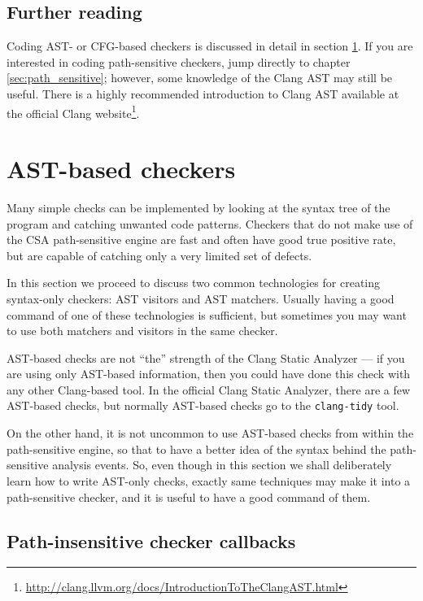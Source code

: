\documentclass[a4paper,12pt]{article}
\begin{document}
\subsection{Further reading}

Coding AST- or CFG-based checkers is discussed in detail in section \ref{sec:ast_based}. If you are interested in coding path-sensitive checkers, jump directly to chapter \ref{sec:path_sensitive}; however, some knowledge of the Clang AST may still be useful. There is a highly recommended introduction to Clang AST available at the official Clang website\footnote{\url{http://clang.llvm.org/docs/IntroductionToTheClangAST.html}}.

\newpage
\section{AST-based checkers}\label{sec:ast_based}

Many simple checks can be implemented by looking at the syntax tree of the program and catching unwanted code patterns. Checkers that do not make use of the CSA path-sensitive engine are fast and often have good true positive rate, but are capable of catching only a very limited set of defects.

In this section we proceed to discuss two common technologies for creating syntax-only checkers: AST visitors and AST matchers. Usually having a good command of one of these technologies is sufficient, but sometimes you may want to use both matchers and visitors in the same checker.

AST-based checks are not ``the'' strength of the Clang Static Analyzer --- if you are using only AST-based information, then you could have done this check with any other Clang-based tool. In the official Clang Static Analyzer, there are a few AST-based checks, but normally AST-based checks go to the \lstinline|clang-tidy| tool.

On the other hand, it is not uncommon to use AST-based checks from within the path-sensitive engine, so that to have a better idea of the syntax behind the path-sensitive analysis events. So, even though in this section we shall deliberately learn how to write AST-only checks, exactly same techniques may make it into a path-sensitive checker, and it is useful to have a good command of them.

\subsection{Path-insensitive checker callbacks}
\end{document}
